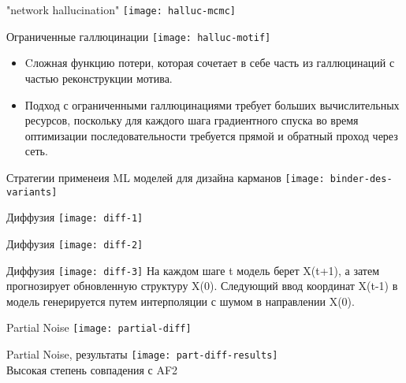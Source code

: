 \begin{frame}{"network hallucination"}
    \centering
    \texttt{[image: halluc-mcmc]}
\end{frame}


\begin{frame}{Ограниченные галлюцинации}
    \centering
    \texttt{[image: halluc-motif]}
    \begin{itemize}
        \item Cложная функцию потери, которая сочетает в себе часть из галлюцинаций с частью реконструкции мотива. 
        \item Подход с ограниченными галлюцинациями требует больших вычислительных ресурсов, поскольку для каждого шага градиентного спуска во время оптимизации последовательности требуется прямой и обратный проход через сеть.
        \end{itemize}
\end{frame}

\begin{frame}{Стратегии применеия ML моделей для дизайна карманов}
    \texttt{[image: binder-des-variants]}    
\end{frame}

\begin{frame}{Диффузия}
    \centering
    \texttt{[image: diff-1]}
\end{frame}

\begin{frame}{Диффузия}
    \centering
    \texttt{[image: diff-2]}
\end{frame}

\begin{frame}{Диффузия}
    \centering
    \texttt{[image: diff-3]}
     На каждом  шаге t модель берет X(t+1), а затем прогнозирует обновленную структуру X(0). Следующий ввод координат X(t-1) в модель генерируется
     путем интерполяции с шумом в направлении X(0).
\end{frame}

\begin{frame}{Partial Noise}
    \centering
    \texttt{[image: partial-diff]}\\
\end{frame}


\begin{frame}{Partial Noise, результаты}
    \centering
    \texttt{[image: part-diff-results]}\\
Высокая степень совпадения с AF2
\end{frame}

